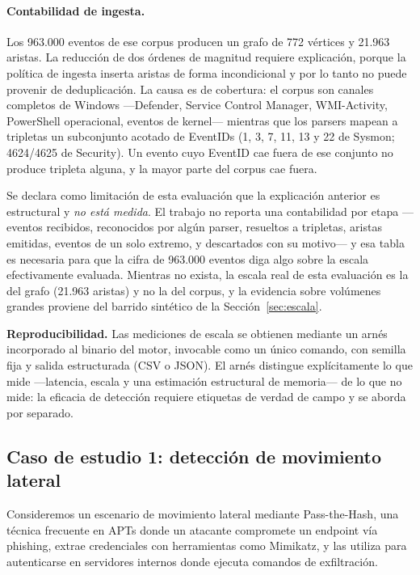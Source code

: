 \documentclass[11pt,a4paper]{article}
\begin{document}
\paragraph{Contabilidad de ingesta.} Los 963.000 eventos de ese corpus
producen un grafo de 772 vértices y 21.963 aristas. La reducción de dos órdenes
de magnitud requiere explicación, porque la política de ingesta inserta aristas
de forma incondicional y por lo tanto no puede provenir de deduplicación. La
causa es de cobertura: el corpus son canales completos de Windows ---Defender,
Service Control Manager, WMI-Activity, PowerShell operacional, eventos de
kernel--- mientras que los parsers mapean a tripletas un subconjunto acotado de
EventIDs (1, 3, 7, 11, 13 y 22 de Sysmon; 4624/4625 de Security). Un evento
cuyo EventID cae fuera de ese conjunto no produce tripleta alguna, y la mayor
parte del corpus cae fuera.

Se declara como limitación de esta evaluación que la explicación anterior es
estructural y \emph{no está medida}. El trabajo no reporta una contabilidad por
etapa ---eventos recibidos, reconocidos por algún parser, resueltos a
tripletas, aristas emitidas, eventos de un solo extremo, y descartados con su
motivo--- y esa tabla es necesaria para que la cifra de 963.000 eventos diga
algo sobre la escala efectivamente evaluada. Mientras no exista, la escala real
de esta evaluación es la del grafo (21.963 aristas) y no la del corpus, y la
evidencia sobre volúmenes grandes proviene del barrido sintético de la
Sección~\ref{sec:escala}.

\textbf{Reproducibilidad.} Las mediciones de escala se obtienen mediante un
arnés incorporado al binario del motor, invocable como un único comando, con
semilla fija y salida estructurada (CSV o JSON). El arnés distingue
explícitamente lo que mide ---latencia, escala y una estimación estructural de
memoria--- de lo que no mide: la eficacia de detección requiere etiquetas de
verdad de campo y se aborda por separado.

\subsection{Caso de estudio 1: detección de movimiento lateral}
Consideremos un escenario de movimiento lateral mediante Pass-the-Hash, una
técnica frecuente en APTs donde un atacante compromete un endpoint vía
phishing, extrae credenciales con herramientas como Mimikatz, y las utiliza
para autenticarse en servidores internos donde ejecuta comandos de
exfiltración.
\end{document}
